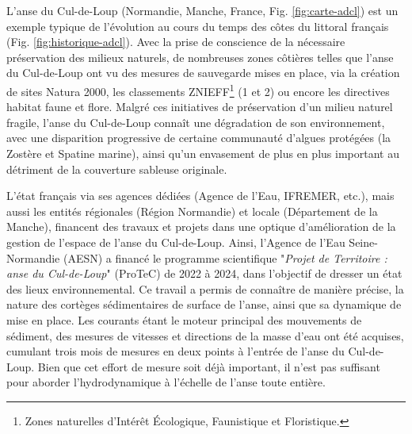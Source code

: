 \documentclass[10pt,a4paper,titlepage]{article}
\begin{document}
    L'anse du Cul-de-Loup (Normandie, Manche, France, Fig. \ref{fig:carte-adcl}) est un exemple typique de l'évolution au cours du temps des côtes du littoral français (Fig. \ref{fig:historique-adcl}). Avec la prise de conscience de la nécessaire préservation des milieux naturels, de nombreuses zones côtières telles que l'anse du Cul-de-Loup ont vu des mesures de sauvegarde mises en place, via la création de sites Natura 2000, les classements ZNIEFF\footnote{Zones naturelles d’Intérêt Écologique, Faunistique et Floristique.} (1 et 2) ou encore les directives habitat faune et flore. Malgré ces initiatives de préservation d'un milieu naturel fragile, l'anse du Cul-de-Loup connaît une dégradation de son environnement, avec une disparition progressive de certaine communauté d'algues protégées (la Zostère et Spatine marine), ainsi qu'un envasement de plus en plus important au détriment de la couverture sableuse originale.
    
    L'état français via ses agences dédiées (Agence de l'Eau, IFREMER, etc.), mais aussi les entités régionales (Région Normandie) et locale (Département de la Manche), financent des travaux et projets dans une optique d'amélioration de la gestion de l'espace de l'anse du Cul-de-Loup. Ainsi, l'Agence de l'Eau Seine-Normandie (AESN) a financé le programme scientifique "\textit{Projet de Territoire : anse du Cul-de-Loup}" (ProTeC) de 2022 à 2024, dans l'objectif de dresser un état des lieux environnemental. Ce travail a permis de connaître de manière précise, la nature des cortèges sédimentaires de surface de l'anse, ainsi que sa dynamique de mise en place. Les courants étant le moteur principal des mouvements de sédiment, des mesures de vitesses et directions de la masse d'eau ont été acquises, cumulant trois mois de mesures en deux points à l'entrée de l'anse du Cul-de-Loup. Bien que cet effort de mesure soit déjà important, il n'est pas suffisant pour aborder l'hydrodynamique à l'échelle de l'anse toute entière.
    
\end{document}
